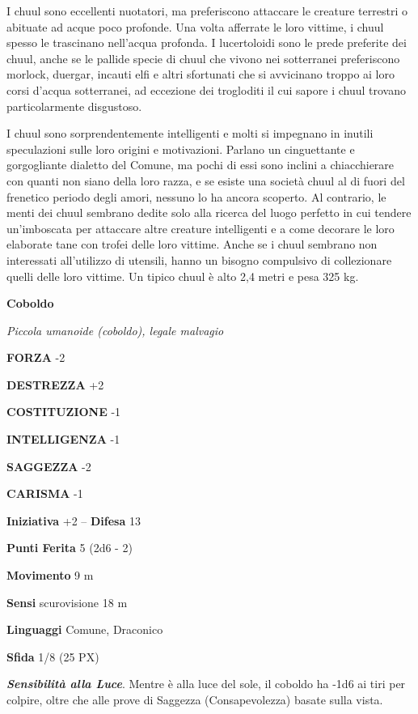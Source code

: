 \begin{multicols}{2}
I chuul sono eccellenti nuotatori, ma preferiscono attaccare le creature terrestri o abituate ad acque poco profonde. Una volta afferrate le loro vittime, i chuul spesso le trascinano nell'acqua profonda. I lucertoloidi sono le prede preferite dei chuul, anche se le pallide specie di chuul che vivono nei sotterranei preferiscono morlock, duergar, incauti elfi e altri sfortunati che si avvicinano troppo ai loro corsi d'acqua sotterranei, ad eccezione dei trogloditi il cui sapore i chuul trovano particolarmente disgustoso.

I chuul sono sorprendentemente intelligenti e molti si impegnano in inutili speculazioni sulle loro origini e motivazioni. Parlano un cinguettante e gorgogliante dialetto del Comune, ma pochi di essi sono inclini a chiacchierare con quanti non siano della loro razza, e se esiste una società chuul al di fuori del frenetico periodo degli amori, nessuno lo ha ancora scoperto. Al contrario, le menti dei chuul sembrano dedite solo alla ricerca del luogo perfetto in cui tendere un'imboscata per attaccare altre creature intelligenti e a come decorare le loro elaborate tane con trofei delle loro vittime. Anche se i chuul sembrano non interessati all'utilizzo di utensili, hanno un bisogno compulsivo di collezionare quelli delle loro vittime. Un tipico chuul è alto 2,4 metri e pesa 325 kg.

\medskip{}\textbf{Coboldo}

\textit{Piccola umanoide (coboldo), legale malvagio}

\textbf{FORZA} -2

\textbf{DESTREZZA} +2

\textbf{COSTITUZIONE} -1

\textbf{INTELLIGENZA} -1

\textbf{SAGGEZZA} -2

\textbf{CARISMA} -1

\textbf{Iniziativa} +2 -- \textbf{Difesa} 13

\textbf{Punti Ferita} 5 (2d6 - 2)

\textbf{Movimento} 9 m

\textbf{Sensi} scurovisione 18 m

\textbf{Linguaggi} Comune, Draconico

\textbf{Sfida} 1/8 (25 PX)

\textit{\textbf{Sensibilità alla Luce}}. Mentre è alla luce del sole, il coboldo ha -1d6 ai tiri per colpire, oltre che alle prove di Saggezza (Consapevolezza) basate sulla vista.


\end{multicols}
